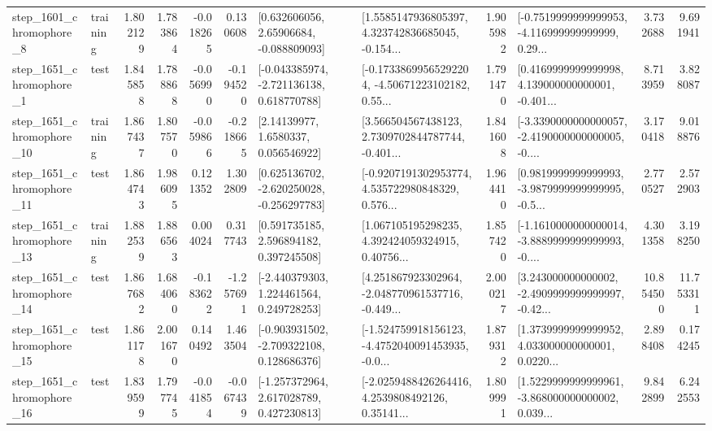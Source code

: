 \begin{tabular}{llrrrrllrlrr}
  step\_1601\_chromophore\_8 &  training &      1.802129 &    1.783864 &     -0.018265 &  0.130608 &     [0.632606056, 2.65906684, -0.088809093] &  [1.5585147936805397, 4.323742836685045, -0.154... &       1.905982 &  [-0.7519999999999953, -4.116999999999999, 0.29... &            3.732688 &          9.691941 \\
  step\_1651\_chromophore\_1 &      test &      1.845858 &    1.788868 &     -0.056990 & -0.194520 &   [-0.043385974, -2.721136138, 0.618770788] &  [-0.17338699565292204, -4.50671223102182, 0.55... &       1.791470 &  [0.4169999999999998, 4.139000000000001, -0.401... &            8.713959 &          3.828087 \\
 step\_1651\_chromophore\_10 &  training &      1.867437 &    1.807570 &     -0.059866 & -0.218665 &        [2.14139977, 1.6580337, 0.056546922] &  [3.566504567438123, 2.7309702844787744, -0.401... &       1.841608 &  [-3.3390000000000057, -2.4190000000000005, -0.... &            3.170418 &          9.018876 \\
 step\_1651\_chromophore\_11 &      test &      1.864743 &    1.986095 &      0.121352 &  1.302809 &   [0.625136702, -2.620250028, -0.256297783] &  [-0.9207191302953774, 4.535722980848329, 0.576... &       1.964410 &  [0.9819999999999993, -3.9879999999999995, -0.5... &            2.770527 &          2.572903 \\
 step\_1651\_chromophore\_13 &  training &      1.882539 &    1.886563 &      0.004024 &  0.317743 &     [0.591735185, 2.596894182, 0.397245508] &  [1.067105195298235, 4.392424059324915, 0.40756... &       1.857420 &  [-1.1610000000000014, -3.8889999999999993, -0.... &            4.301358 &          3.198250 \\
 step\_1651\_chromophore\_14 &      test &      1.867682 &    1.684060 &     -0.183622 & -1.257691 &    [-2.440379303, 1.224461564, 0.249728253] &  [4.251867923302964, -2.048770961537716, -0.449... &       2.000217 &  [3.243000000000002, -2.4909999999999997, -0.42... &           10.854500 &         11.753311 \\
 step\_1651\_chromophore\_15 &      test &      1.861178 &    2.001670 &      0.140492 &  1.463504 &   [-0.903931502, -2.709322108, 0.128686376] &  [-1.524759918156123, -4.4752040091453935, -0.0... &       1.879312 &  [1.3739999999999952, 4.033000000000001, 0.0220... &            2.898408 &          0.174245 \\
 step\_1651\_chromophore\_16 &      test &      1.839599 &    1.797745 &     -0.041854 & -0.067439 &    [-1.257372964, 2.617028789, 0.427230813] &  [-2.0259488426264416, 4.2539808492126, 0.35141... &       1.809991 &  [1.5229999999999961, -3.868000000000002, 0.039... &            9.842899 &          6.242553 \\

\end{tabular}

